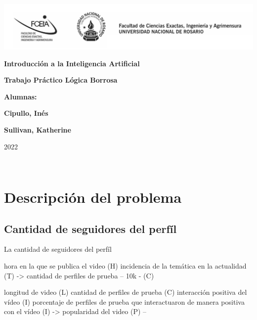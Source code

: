 \documentclass{article}
\begin{document}
\begin{titlepage}
    \hspace{-2.5cm}\includegraphics[scale= 0.48]{header.png}
    \begin{center}
        \vfill
            \noindent\textbf{\Huge Introducción a la Inteligencia Artificial}\par
            \vspace{.5cm}
            \noindent\textbf{\Huge Trabajo Práctico Lógica Borrosa}\par
            \vspace{.5cm}
        \vfill
        \noindent \textbf{\huge Alumnas:}\par
        \vspace{.5cm}
        \noindent \textbf{\Large Cipullo, Inés}\par
        \noindent \textbf{\Large Sullivan, Katherine}\par
 
        \vfill
        \noindent\large 2022
    \end{center}
\end{titlepage}
\ 



\section*{Descripción del problema}

\subsection*{Cantidad de seguidores del perfíl}

La cantidad de seguidores del perfíl

hora en la que se publica el video (H) 
incidencia de la temática en la actualidad (T)
-> cantidad de perfiles de prueba -- 10k - (C)

longitud de video (L)
cantidad de perfiles de prueba (C)
interacción positiva del vídeo (I)
porcentaje de perfiles de prueba que interactuaron de manera positiva con el vídeo (I) 
-> popularidad del video (P) -- 
\end{document}
